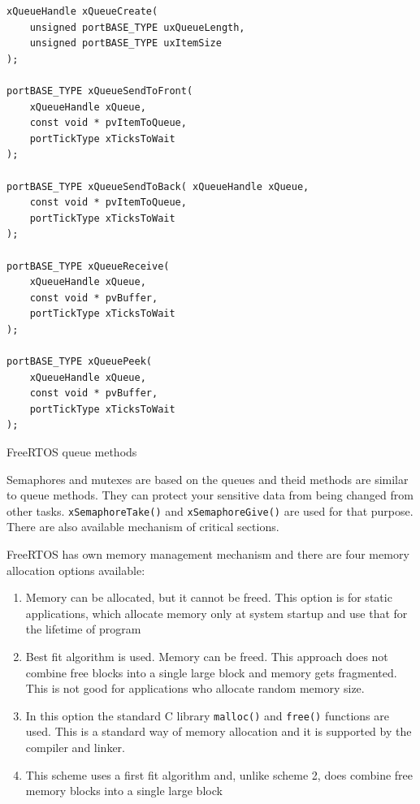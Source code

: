\begin{listing}[h]
\begin{verbatim}
xQueueHandle xQueueCreate( 
	unsigned portBASE_TYPE uxQueueLength, 
	unsigned portBASE_TYPE uxItemSize 
); 

portBASE_TYPE xQueueSendToFront( 
	xQueueHandle xQueue, 
	const void * pvItemToQueue, 
	portTickType xTicksToWait 
);

portBASE_TYPE xQueueSendToBack( xQueueHandle xQueue, 
	const void * pvItemToQueue, 
	portTickType xTicksToWait 
); 

portBASE_TYPE xQueueReceive( 
	xQueueHandle xQueue,
	const void * pvBuffer, 
	portTickType xTicksToWait 
);

portBASE_TYPE xQueuePeek( 
	xQueueHandle xQueue,
	const void * pvBuffer, 
	portTickType xTicksToWait 
);
\end{verbatim}
\caption{FreeRTOS queue methods}
\label{lst:freertos_queue_methods}
\end{listing} 

Semaphores and mutexes are based on the queues and theid methods are similar to
queue methods.
They can protect your sensitive data from being changed from other tasks.
\texttt{xSemaphoreTake()} and \texttt{xSemaphoreGive()} are used for that
purpose. There are also available mechanism of critical sections.

FreeRTOS has own memory management mechanism and there are four memory
allocation  options available:
\begin{enumerate}
  \item Memory can be allocated, but it cannot be freed. This option is for
  static applications, which allocate memory only at system startup and use that for
  the lifetime of program 
  \item  Best fit algorithm is used. Memory can be freed. This approach does not
  combine free blocks into a single large block and memory gets fragmented. This
  is not good for applications who allocate random memory size.
  \item  In this option the standard C library \texttt{malloc()} and
  \texttt{free()} functions are used. This is a standard way of memory
  allocation and it is supported by the compiler and linker.
  \item This scheme uses a first fit algorithm and, unlike scheme 2, does
  combine free memory blocks into a single large block
\end{enumerate}

